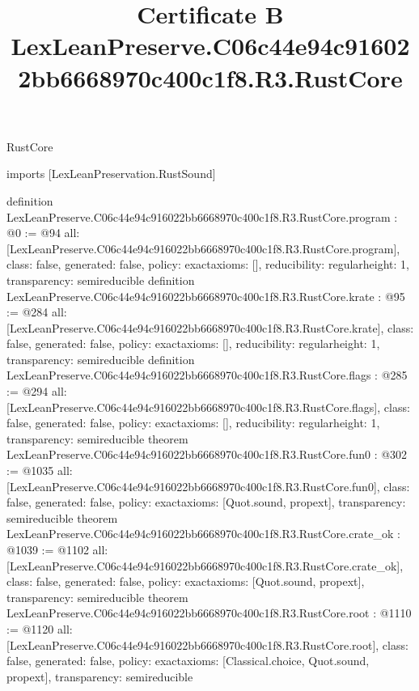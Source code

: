\begin{lexlean}{RustCore}
\title{Certificate B LexLeanPreserve.C06c44e94c916022bb6668970c400c1f8.R3.RustCore}
\begin{coremodule}
imports [LexLeanPreservation.RustSound]

definition LexLeanPreserve.C06c44e94c916022bb6668970c400c1f8.R3.RustCore.program : @0 := @94 {
  all: [LexLeanPreserve.C06c44e94c916022bb6668970c400c1f8.R3.RustCore.program],
  class: false,
  generated: false,
  policy: exact{axioms: []},
  reducibility: regular{height: 1},
  transparency: semireducible
}
definition LexLeanPreserve.C06c44e94c916022bb6668970c400c1f8.R3.RustCore.krate : @95 := @284 {
  all: [LexLeanPreserve.C06c44e94c916022bb6668970c400c1f8.R3.RustCore.krate],
  class: false,
  generated: false,
  policy: exact{axioms: []},
  reducibility: regular{height: 1},
  transparency: semireducible
}
definition LexLeanPreserve.C06c44e94c916022bb6668970c400c1f8.R3.RustCore.flags : @285 := @294 {
  all: [LexLeanPreserve.C06c44e94c916022bb6668970c400c1f8.R3.RustCore.flags],
  class: false,
  generated: false,
  policy: exact{axioms: []},
  reducibility: regular{height: 1},
  transparency: semireducible
}
theorem LexLeanPreserve.C06c44e94c916022bb6668970c400c1f8.R3.RustCore.fun0 : @302 := @1035 {
  all: [LexLeanPreserve.C06c44e94c916022bb6668970c400c1f8.R3.RustCore.fun0],
  class: false,
  generated: false,
  policy: exact{axioms: [Quot.sound, propext]},
  transparency: semireducible
}
theorem LexLeanPreserve.C06c44e94c916022bb6668970c400c1f8.R3.RustCore.crate_ok : @1039 := @1102 {
  all: [LexLeanPreserve.C06c44e94c916022bb6668970c400c1f8.R3.RustCore.crate_ok],
  class: false,
  generated: false,
  policy: exact{axioms: [Quot.sound, propext]},
  transparency: semireducible
}
theorem LexLeanPreserve.C06c44e94c916022bb6668970c400c1f8.R3.RustCore.root : @1110 := @1120 {
  all: [LexLeanPreserve.C06c44e94c916022bb6668970c400c1f8.R3.RustCore.root],
  class: false,
  generated: false,
  policy: exact{axioms: [Classical.choice, Quot.sound, propext]},
  transparency: semireducible
}


\end{coremodule}
\end{lexlean}
